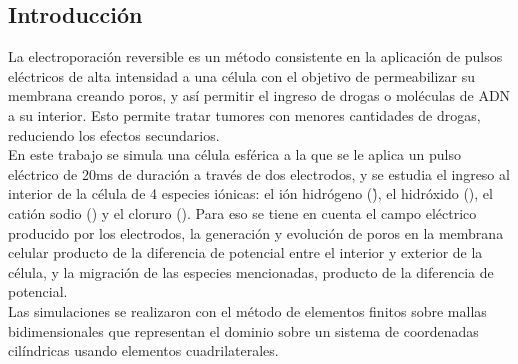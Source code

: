 \documentclass[a0,portrait]{a0poster}
\begin{document}
\vspace{1cm} %


\begin{multicols}{2} %

\color{Navy} %

\color{DarkSlateGray}

\small

\section*{Introducción}
La electroporación reversible es un método consistente en la aplicación de pulsos eléctricos de alta intensidad a una célula con el objetivo de permeabilizar su membrana creando poros, y así permitir el ingreso de drogas o moléculas de ADN a su interior. Esto permite tratar tumores con menores cantidades de drogas, reduciendo los efectos secundarios.\\

En este trabajo se simula una célula esférica a la que se le aplica un pulso eléctrico de 20\si{\milli\second} de duración a través de dos electrodos, y se estudia el ingreso al interior de la célula de 4 especies iónicas: el ión hidrógeno (\h), el hidróxido (\oh), el catión sodio (\na) y el cloruro (\cl). Para eso se tiene en cuenta el campo eléctrico producido por los electrodos, la generación y evolución de poros en la membrana celular producto de la diferencia de potencial entre el interior y exterior de la célula, y la migración de las especies mencionadas, producto de la diferencia de potencial.\\

Las simulaciones se realizaron con el método de elementos finitos sobre mallas bidimensionales que representan el dominio sobre un sistema de coordenadas cilíndricas usando elementos cuadrilaterales.




\end{multicols}
\end{document}
